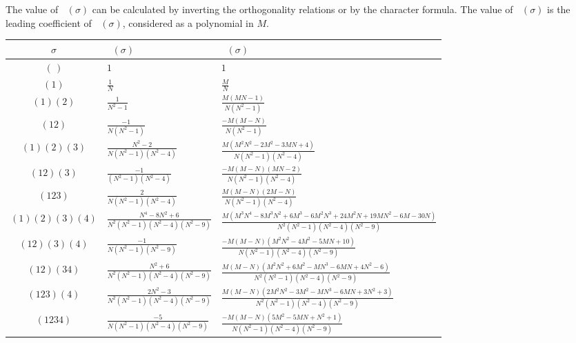 \documentclass[a4paper]{article}
\theoremstyle{plain}
\numberwithin{theorem}{section}
\theoremstyle{definition}
\theoremstyle{remark}
\newcommand{\UM}{\mathbf{U}}			%
\DeclareMathOperator{\UW}{Wg^{\UM}}		%
\newcommand{\SM}{\mathbf{S}}			%
\DeclareMathOperator{\SW}{Wg^{\SM}}		%
\begin{document}
The value of $\SW(\sigma)$ can be calculated by inverting the orthogonality relations or by the character formula. The value of $\UW(\sigma)$ is the leading coefficient of $\SW(\sigma)$, considered as a polynomial in $M$.


\begin{center}
\begin{tabularx}{\textwidth}{cp{40mm}X} \toprule
$\sigma$ & $\UW(\sigma)$ & $\SW(\sigma)$ \\ \midrule
$(\,)$ & $1$ & $1$ \\ \midrule
$(1)$ & $\frac{1}{N}$ & $\frac{M}{N}$ \\ \midrule
$(1)(2)$ & $\frac{1}{N^2-1}$ & $\frac{M(MN-1)}{N (N^2-1)}$ \\
$(12)$ & $\frac{-1}{N(N^2-1)}$ & $\frac{-M(M - N)}{N (N^2-1)}$ \\ \midrule
$(1)(2)(3)$ & $\frac{N^2-2}{N (N^2-1) (N^2-4)}$ & $\frac{M(M^2N^2 - 2M^2 - 3MN + 4)}{N (N^2-1) (N^2-4)}$ \\
$(12)(3)$ & $\frac{-1}{(N^2-1) (N^2-4)}$ & $\frac{-M (M-N) (MN-2)}{N (N^2-1) (N^2-4)}$ \\
$(123)$ & $\frac{2}{N (N^2-1) (N^2-4)}$ & $\frac{M (M-N) (2M-N)}{N (N^2-1) (N^2-4)}$ \\ \midrule
$(1)(2)(3)(4)$ & $\frac{N^4 - 8N^2 + 6}{N^2 (N^2-1) (N^2-4) (N^2-9)}$ & $\frac{M(M^3N^4 - 8M^3N^2 + 6M^3 - 6M^2N^3 + 24M^2N + 19MN^2 - 6M - 30N)}{N^2 (N^2-1) (N^2-4) (N^2-9)}$ \\
$(12)(3)(4)$ & $\frac{-1}{N (N^2-1) (N^2-9)}$ & $\frac{-M(M - N)(M^2N^2 - 4M^2 - 5MN + 10)}{N (N^2-1) (N^2-4) (N^2-9)}$ \\
$(12)(34)$ & $\frac{N^2 + 6}{N^2 (N^2-1) (N^2-4) (N^2-9)}$ & $\frac{M(M - N)(M^2N^2 + 6M^2 - MN^3 - 6MN + 4N^2 - 6)}{N^2 (N^2-1) (N^2-4) (N^2-9)}$ \\
$(123)(4)$ & $\frac{2N^2 - 3}{N^2 (N^2-1) (N^2-4) (N^2-9)}$ & $\frac{M(M - N)(2M^2N^2 - 3M^2- MN^3 - 6MN + 3N^2 + 3)}{N^2 (N^2-1) (N^2-4) (N^2-9)}$ \\
$(1234)$ & $\frac{-5}{N (N^2-1) (N^2-4) (N^2-9)}$ & $\frac{-M(M - N)(5M^2 - 5MN + N^2 + 1)}{N (N^2-1) (N^2-4) (N^2-9)}$ \\ \bottomrule
\end{tabularx}
\end{center}





\end{document}
